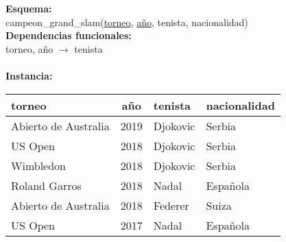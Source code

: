 \documentclass[preview]{standalone}
\begin{document}
\textbf{Esquema:}\\
campeon\_grand\_slam(\underline{torneo}, \underline{a\~no}, tenista, nacionalidad)\\

\textbf{Dependencias funcionales:}\\
torneo, a\~no $\rightarrow$ tenista\\
{\color{red}{tenista $\rightarrow$ nacionalidad}}\\

\textbf{Instancia:}
\begin{center}
\begin{tabular}{| l | c | l | l |}\hline			
	torneo & a\~no & tenista & nacionalidad  \\\hline			
	Abierto de Australia & 2019 & Djokovic & Serbia \\
	US Open & 2018 & Djokovic & Serbia \\
	Wimbledon & 2018 & Djokovic & Serbia \\
	Roland Garros & 2018 & Nadal & Espa\~nola \\
	Abierto de Australia & 2018 & Federer & Suiza \\
	US Open & 2017 & Nadal & Espa\~nola \\\hline
\end{tabular}
\end{center}
\end{document}
